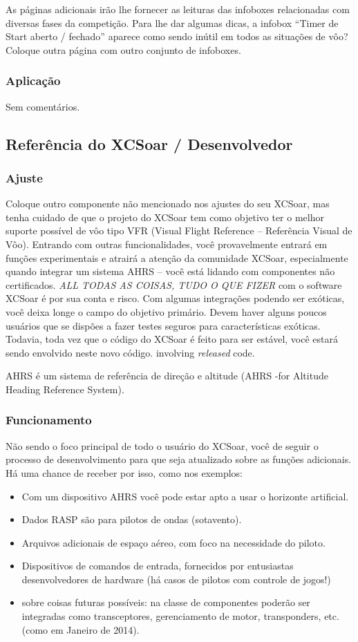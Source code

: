 As páginas adicionais irão lhe fornecer as leituras das infoboxes relacionadas com diversas fases da competição.  Para lhe dar algumas dicas, a infobox “Timer de Start aberto / fechado” aparece como sendo inútil em todos as situações de vôo?  Coloque outra página com outro conjunto de infoboxes.


\subsubsection*{Aplicação}
Sem comentários.

\subsection*{Referência do XCSoar / Desenvolvedor}
\subsubsection*{Ajuste} Coloque outro componente não mencionado nos ajustes do seu XCSoar, mas tenha cuidado de que o projeto do XCSoar tem como objetivo ter o melhor suporte possível de vôo tipo VFR (Visual Flight Reference – Referência Visual de Vôo).  Entrando com outras funcionalidades, você provavelmente entrará em funções experimentais e atrairá a atenção da comunidade XCSoar, especialmente quando integrar um sistema AHRS – você está lidando com componentes não certificados.   \tip \emph{ALL TODAS AS COISAS, TUDO O QUE FIZER} com o software XCSoar é por sua conta e risco.  Com algumas integrações podendo ser exóticas, você deixa longe o campo do objetivo primário.  Devem haver alguns poucos usuários que se dispões a fazer testes seguros para características exóticas.  Todavia, toda vez que o código do XCSoar é feito para ser estável, você estará sendo envolvido neste novo código. involving \emph{released} 
code.

AHRS é um sistema de referência de direção e altitude (AHRS -for Altitude Heading Reference System).

\subsubsection*{Funcionamento} Não sendo o foco principal de todo o usuário do XCSoar, você de seguir o processo de desenvolvimento para que seja atualizado sobre as funções adicionais.  Há uma chance de receber por isso, como nos exemplos:
\begin{itemize}
\item Com um dispositivo AHRS você pode estar apto a usar o horizonte artificial.
\item Dados RASP são para pilotos de ondas (sotavento).
\item Arquivos adicionais de espaço aéreo, com foco na necessidade do piloto. 
\item Dispositivos de comandos de entrada, fornecidos por entusiastas desenvolvedores de hardware (há casos de pilotos com controle de jogos!)
\item sobre coisas futuras possíveis: na classe de componentes poderão ser integradas como transceptores, gerenciamento de motor, transponders, etc. (como em Janeiro de 2014).
\end{itemize}

